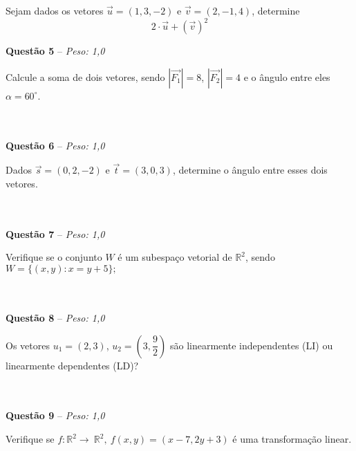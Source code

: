 \documentclass[a4paper,11pt]{article}
\begin{document}
Sejam dados os vetores $\vec u=(1,3,-2)$ e $\vec v=(2,-1,4)$, determine
$$2\cdot \vec u + (\vec v)^2$$

\begin{mdframed}[backgroundcolor=gray!20]
\textbf{Questão 5} -- \textit{Peso: 1,0}
\end{mdframed}

Calcule a soma de dois vetores, sendo $|\vec{F_1}|=8$, $|\vec{F_2}|=4$ e o ângulo entre eles $\alpha=60^{\circ}$.
\\
\\
\\

\begin{mdframed}[backgroundcolor=gray!20]
\textbf{Questão 6} -- \textit{Peso: 1,0}
\end{mdframed}

Dados $\vec{s}=(0, 2, -2)$ e $\vec{t}=(3, 0, 3)$, determine o ângulo entre esses dois vetores. 
\\
\\
\\

\begin{mdframed}[backgroundcolor=gray!20]
\textbf{Questão 7} -- \textit{Peso: 1,0}
\end{mdframed}

Verifique se o conjunto $W$ é um subespaço vetorial de $\mathbb{R}^2$, sendo $W=\{(x,y):x=y+5\};$ 
\\
\\
\\

\begin{mdframed}[backgroundcolor=gray!20]
\textbf{Questão 8} -- \textit{Peso: 1,0}
\end{mdframed}

Os vetores $u_1 = (2, 3)$, $u_2 = (3, \dfrac{9}{2})$ são linearmente independentes (LI) ou linearmente dependentes (LD)?
\\
\\
\\

\begin{mdframed}[backgroundcolor=gray!20]
\textbf{Questão 9} -- \textit{Peso: 1,0}
\end{mdframed}

Verifique se $f: \mathbb{R}^2 \longrightarrow \ \mathbb{R}^2, \ f(x,y)=(x-7,2y+3)$ é uma transformação linear.
\\
\\
\\
\end{document}
